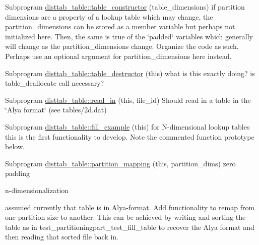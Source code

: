 
\begin{DoxyRefList}
\item[Subprogram \mbox{\hyperlink{namespacedisttab__table_a6b30669a17ed75f6ebac958f890655af}{disttab\+\_\+table\+::table\+\_\+constructor}} (table\+\_\+dimensions)]\label{todo__todo000001}%
%
if partition dimensions are a property of a lookup table which may change, the partition\+\_\+dimensions can be stored as a member variable but perhaps not initialized here. Then, the same is true of the \char`\"{}padded\char`\"{} variables which generally will change as the partition\+\_\+dimensions change. Organize the code as such. Perhaps use an optional argument for partition\+\_\+dimensions here instead.  
\item[Subprogram \mbox{\hyperlink{namespacedisttab__table_a00320b1b054be17b502e8bc01bdfb8cd}{disttab\+\_\+table\+::table\+\_\+destructor}} (this)]\label{todo__todo000002}%
%
what is this exactly doing? is table\+\_\+deallocate call necessary?  
\item[Subprogram \mbox{\hyperlink{namespacedisttab__table_a47c132f14609e77c6bd02ed429aaa515}{disttab\+\_\+table\+::read\+\_\+in}} (this, file\+\_\+id)]\label{todo__todo000003}%
%
Should read in a table in the \char`\"{}\+Alya format\char`\"{} (see tables/2d.\+dat)  
\item[Subprogram \mbox{\hyperlink{namespacedisttab__table_a5ebcbc269c4e666ca0725852783d6d76}{disttab\+\_\+table\+::fill\+\_\+example}} (this)]\label{todo__todo000004}%
%
for N-\/dimensional lookup tables this is the first functionality to develop. Note the commented function prototype below.  
\item[Subprogram \mbox{\hyperlink{namespacedisttab__table_a2d5187579c137716a67c5f592eef7328}{disttab\+\_\+table\+::partition\+\_\+mapping}} (this, partition\+\_\+dims)]\label{todo__todo000005}%
%
zero padding 

n-\/dimensionalization 

assumed currently that table is in Alya-\/format. Add functionality to remap from one partition size to another. This can be achieved by writing and sorting the table as in test\+\_\+partitioningpart\+\_\+test\+\_\+fill\+\_\+table to recover the Alya format and then reading that sorted file back in. 


\end{DoxyRefList}
